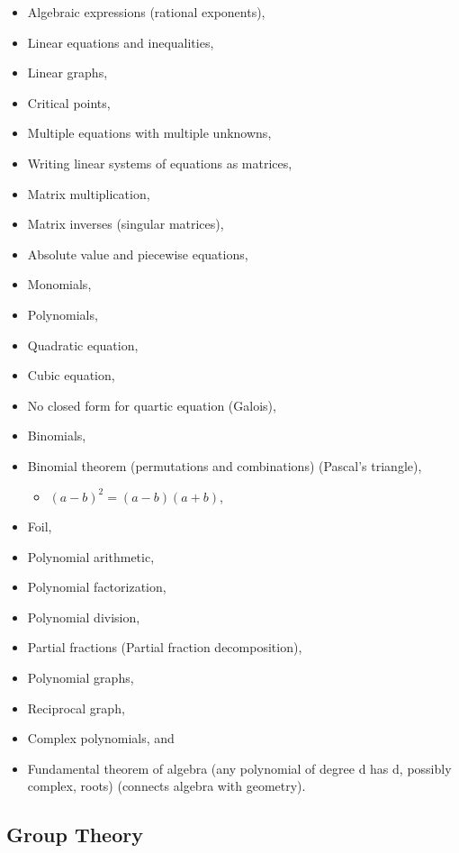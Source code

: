 \begin{itemize}
\tightlist
\item
  Algebraic expressions (rational exponents),
\item
  Linear equations and inequalities,
\item
  Linear graphs,
\item
  Critical points,
\item
  Multiple equations with multiple unknowns,
\item
  Writing linear systems of equations as matrices,
\item
  Matrix multiplication,
\item
  Matrix inverses (singular matrices),
\item
  Absolute value and piecewise equations,
\item
  Monomials,
\item
  Polynomials,
\item
  Quadratic equation,
\item
  Cubic equation,
\item
  No closed form for quartic equation (Galois),
\item
  Binomials,
\item
  Binomial theorem (permutations and combinations) (Pascal's triangle),

  \begin{itemize}
  \tightlist
  \item
    \((a-b)^2 = (a-b)(a+b)\),
  \end{itemize}
\item
  Foil,
\item
  Polynomial arithmetic,
\item
  Polynomial factorization,
\item
  Polynomial division,
\item
  Partial fractions (Partial fraction decomposition),
\item
  Polynomial graphs,
\item
  Reciprocal graph,
\item
  Complex polynomials, and
\item
  Fundamental theorem of algebra (any polynomial of degree d has d,
  possibly complex, roots) (connects algebra with geometry).
\end{itemize}

\hypertarget{group-theory}{%
\subsection{Group Theory}\label{group-theory}}

